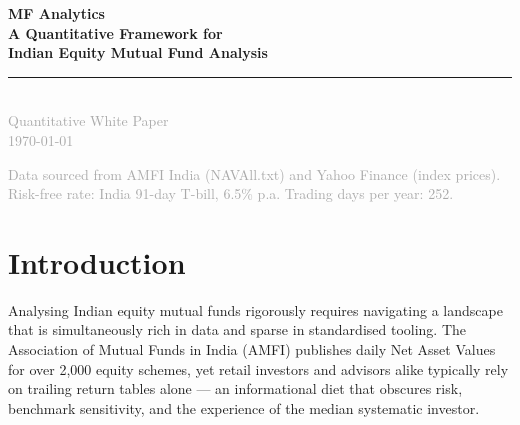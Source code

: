 \documentclass[12pt, a4paper]{article}
\begin{document}
\begin{titlepage}
  \centering
  \vspace*{2cm}
  {\Huge\bfseries\color{accent}
    MF Analytics\\[0.4em]
    \large A Quantitative Framework for\\
    Indian Equity Mutual Fund Analysis
  }\\[2em]
  \rule{0.6\textwidth}{1.2pt}\\[1.5em]
  {\large\textcolor{darkgray}{Quantitative White Paper}}\\[0.5em]
  {\normalsize\textcolor{darkgray}{\today}}\\[3em]

  \begin{abstract}
    \noindent
    This white paper presents the complete quantitative framework underlying the
    MF Analytics platform for Indian equity mutual funds.  We document the
    mathematical definitions, computational procedures, and interpretive
    guidelines for every metric exposed in the platform — spanning return
    analysis, risk measurement, risk-adjusted performance, benchmark-relative
    attribution, Systematic Investment Plan (SIP) modelling, and peer
    comparison via quartile ranking.  All formulas are implemented verbatim in
    the platform's \texttt{analytics.py} engine, making this document both a
    technical reference and an investor education resource.  Where appropriate
    we discuss the economic intuition behind each metric and note common
    misinterpretations.
  \end{abstract}

  \vfill
  {\small\textcolor{darkgray}{
    Data sourced from AMFI India (NAVAll.txt) and Yahoo Finance (index
    prices).  Risk-free rate: India 91-day T-bill, 6.5\% p.a.
    Trading days per year: 252.
  }}
\end{titlepage}

\tableofcontents
\newpage

\section{Introduction}

Analysing Indian equity mutual funds rigorously requires navigating a
landscape that is simultaneously rich in data and sparse in standardised
tooling.  The Association of Mutual Funds in India (AMFI) publishes daily
Net Asset Values for over 2{,}000 equity schemes, yet retail investors and
advisors alike typically rely on trailing return tables alone — an
informational diet that obscures risk, benchmark sensitivity, and the
experience of the median systematic investor.
\end{document}
